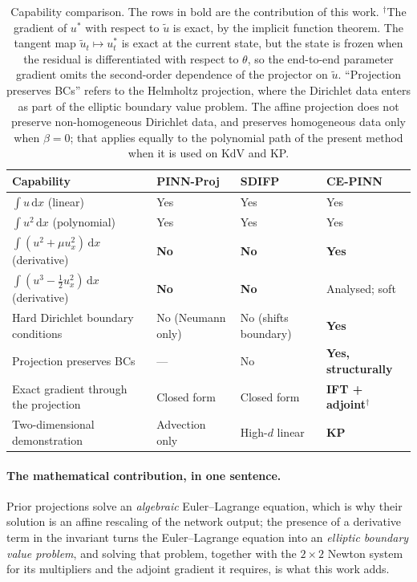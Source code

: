 \documentclass[11pt,a4paper]{article}
\theoremstyle{remark}
\newcommand{\dx}{\,\mathrm{d}x}
\newcommand{\ut}{\tilde{u}}
\newcommand{\us}{u^{*}}
\begin{document}
\begin{table}[h]
\centering
\small
\begin{tabular}{p{5.4cm} p{2.6cm} p{2.4cm} p{2.9cm}}
\toprule
Capability & PINN-Proj & SDIFP & \textbf{CE-PINN} \\
\midrule
$\int u\dx$ (linear)                      & Yes & Yes & Yes \\
$\int u^2\dx$ (polynomial)                & Yes & Yes & Yes \\
$\int(u^2+\mu u_x^2)\dx$ (derivative)     & \textbf{No} & \textbf{No} & \textbf{Yes} \\
$\int(u^3-\tfrac12u_x^2)\dx$ (derivative) & \textbf{No} & \textbf{No} & Analysed; soft \\
Hard Dirichlet boundary conditions        & No (Neumann only) & No (shifts boundary) & \textbf{Yes} \\
Projection preserves BCs                  & --- & No & \textbf{Yes, structurally} \\
Exact gradient through the projection     & Closed form & Closed form & \textbf{IFT + adjoint}$^\dagger$ \\
Two-dimensional demonstration             & Advection only & High-$d$ linear & \textbf{KP} \\
\bottomrule
\end{tabular}
\caption{Capability comparison. The rows in bold are the contribution of this
work. $^\dagger$The gradient of $\us$ with respect to $\ut$ is exact, by the
implicit function theorem. The tangent map $\ut_t \mapsto \us_t$ is exact at
the current state, but the state is frozen when the residual is differentiated
with respect to $\theta$, so the end-to-end parameter gradient omits the
second-order dependence of the projector on $\ut$. ``Projection preserves
BCs'' refers to the Helmholtz projection, where
the Dirichlet data enters as part of the elliptic boundary value problem. The
affine projection does not preserve non-homogeneous Dirichlet data, and
preserves homogeneous data only when $\beta = 0$; that applies equally to the
polynomial path of the present method when it is used on KdV and KP.}
\end{table}

\paragraph{The mathematical contribution, in one sentence.}
Prior projections solve an \emph{algebraic} Euler--Lagrange equation, which is
why their solution is an affine rescaling of the network output; the presence of
a derivative term in the invariant turns the Euler--Lagrange equation into an
\emph{elliptic boundary value problem}, and solving that problem, together with
the $2\times2$ Newton system for its multipliers and the adjoint gradient it
requires, is what this work adds.
\end{document}
